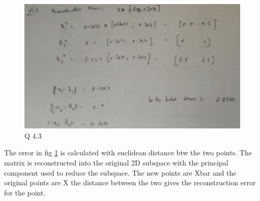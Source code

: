 \documentclass[10pt, letterpaper]{article}
\begin{document}
\begin{figure}[h!]
	\includegraphics[width=\linewidth]{4_3.jpg}
	\caption{Q 4.3}
	\label{fig:Q 4.3}
\end{figure}
The error in fig \ref{fig:Q 4.3} is calculated with euclidean distance btw the two points. The matrix is reconstructed into the original 2D subspace with the principal component used to reduce the subspace. The new points are Xbar and the original points are X the distance between the two gives the reconstruction error for the point.
\end{document}
